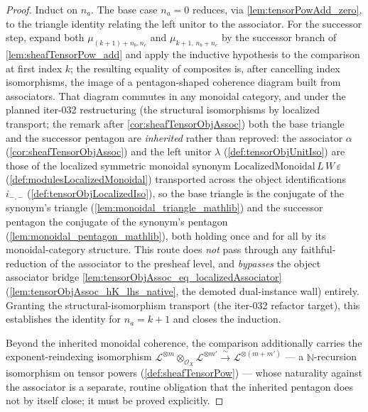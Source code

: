\begin{proof}
  Induct on \(n_a\). The base case \(n_a = 0\) reduces, via
  \cref{lem:tensorPowAdd_zero}, to the triangle identity relating the left unitor
  to the associator. For the successor step, expand both
  \(\mu_{(k+1)+n_b,n_c}\) and \(\mu_{k+1,\,n_b+n_c}\) by the successor branch of
  \cref{lem:sheafTensorPow_add} and apply the inductive hypothesis to the
  comparison at first index \(k\); the resulting equality of composites is, after
  cancelling index isomorphisms, the image of a pentagon-shaped coherence diagram
  built from associators. That diagram commutes in any monoidal category, and under
  the planned iter-032 restructuring (the structural isomorphisms by localized
  transport; the remark after \cref{cor:sheafTensorObjAssoc}) both the base triangle
  and the successor pentagon are \emph{inherited} rather than reproved: the
  associator \(\alpha\) (\cref{cor:sheafTensorObjAssoc}) and the left unitor
  \(\lambda\) (\cref{def:tensorObjUnitIso}) are those of the localized symmetric
  monoidal synonym \(\mathrm{LocalizedMonoidal}\,L\,W\,\varepsilon\)
  (\cref{def:modulesLocalizedMonoidal}) transported across the object
  identifications \(i_{-,-}\) (\cref{def:tensorObjLocalizedIso}), so the base
  triangle is the conjugate of the synonym's triangle
  (\cref{lem:monoidal_triangle_mathlib}) and the successor pentagon the conjugate of
  the synonym's pentagon (\cref{lem:monoidal_pentagon_mathlib}), both holding once
  and for all by its monoidal-category structure. This route does \emph{not} pass
  through any faithful-reduction of the associator to the presheaf level, and
  \emph{bypasses} the object associator bridge
  \cref{lem:tensorObjAssoc_eq_localizedAssociator}
  (\cref{lem:tensorObjAssoc_hK_lhs_native}, the demoted dual-instance wall)
  entirely. Granting the structural-isomorphism transport (the iter-032 refactor
  target), this establishes the identity for \(n_a = k+1\) and closes the induction.

  Beyond the inherited monoidal coherence, the comparison additionally carries the
  exponent-reindexing isomorphism \(\mathcal{L}^{\otimes m} \otimes_{\mathcal{O}_X}
  \mathcal{L}^{\otimes m'} \xrightarrow{\ \sim\ } \mathcal{L}^{\otimes (m+m')}\) ---
  a \(\mathbb{N}\)-recursion isomorphism on tensor powers
  (\cref{def:sheafTensorPow}) --- whose naturality against the associator is a
  separate, routine obligation that the inherited pentagon does not by itself
  close; it must be proved explicitly.
\end{proof}

